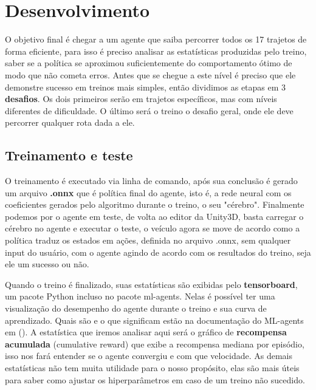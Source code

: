 \section{Desenvolvimento}\label{metodologia}
O objetivo final é chegar a um agente que saiba percorrer todos os 17 trajetos de forma eficiente, para isso é preciso analisar as estatísticas produzidas pelo treino, saber se a política se aproximou suficientemente do comportamento ótimo de modo que não cometa erros. Antes que se chegue a este nível é preciso que ele demonstre sucesso em treinos mais simples, então dividimos as etapas em 3 \textbf{desafios}. Os dois primeiros serão em trajetos específicos, mas com níveis diferentes de dificuldade. O último será o treino o desafio geral, onde ele deve percorrer qualquer rota dada a ele.


\subsection{Treinamento e teste}
O treinamento é executado via linha de comando, após sua conclusão é gerado um arquivo \textbf{.onnx} que é política final do agente, isto é, a rede neural com os coeficientes gerados pelo algoritmo durante o treino, o seu "cérebro". Finalmente podemos por o agente em teste, de volta ao editor da Unity3D, basta carregar o cérebro no agente e executar o teste, o veículo agora se move de acordo como a política traduz os estados em ações, definida no arquivo .onnx, sem qualquer input do usuário, com o agente agindo de acordo com os resultados do treino, seja ele um sucesso ou não. 

Quando o treino é finalizado, suas estatísticas são exibidas pelo \textbf{tensorboard}, um pacote Python incluso no pacote ml-agents. Nelas é possível ter uma visualização do desempenho do agente durante o treino e sua curva de aprendizado. Quais são e o que significam estão na documentação do ML-agents em (). A estatística que iremos analisar aqui será o gráfico de \textbf{recompensa acumulada} (cumulative reward) que exibe a recompensa mediana por episódio, isso nos fará entender se o agente convergiu e com que velocidade. As demais estatísticas não tem muita utilidade para o nosso propósito, elas são mais úteis para saber como ajustar os hiperparâmetros em caso de um treino não sucedido.


